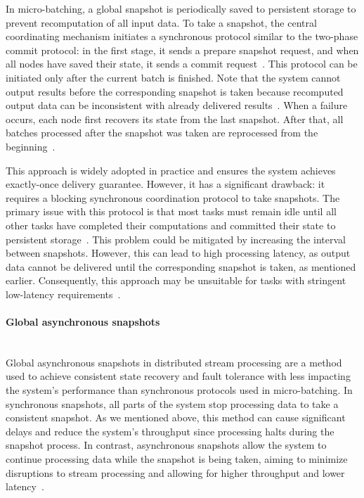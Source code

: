 In micro-batching, a global snapshot is periodically saved to persistent storage to prevent recomputation of all input data. To take a snapshot, the central coordinating mechanism initiates a synchronous protocol similar to the two-phase commit protocol: in the first stage, it sends a prepare snapshot request, and when all nodes have saved their state, it sends a commit request~\cite{carbone2018scalable}. This protocol can be initiated only after the current batch is finished. Note that the system cannot output results before the corresponding snapshot is taken because recomputed output data can be inconsistent with already delivered results~\cite{carbone2018scalable, thepaper}. When a failure occurs, each node first recovers its state from the last snapshot. After that, all batches processed after the snapshot was taken are reprocessed from the beginning~\cite{Zaharia:2012:DSE:2342763.2342773}.

This approach is widely adopted in practice and ensures the system achieves exactly-once delivery guarantee. However, it has a significant drawback: it requires a blocking synchronous coordination protocol to take snapshots. The primary issue with this protocol is that most tasks must remain idle until all other tasks have completed their computations and committed their state to persistent storage~\cite{carbone2018scalable, thepaper}. This problem could be mitigated by increasing the interval between snapshots. However, this can lead to high processing latency, as output data cannot be delivered until the corresponding snapshot is taken, as mentioned earlier. Consequently, this approach may be unsuitable for tasks with stringent low-latency requirements~\cite{carbone2018scalable}.

\paragraph{Global asynchronous snapshots} \mbox{} \\

Global asynchronous snapshots in distributed stream processing are a method used to achieve consistent state recovery and fault tolerance with less impacting the system's performance than synchronous protocols used in micro-batching. In synchronous snapshots, all parts of the system stop processing data to take a consistent snapshot. As we mentioned above, this method can cause significant delays and reduce the system's throughput since processing halts during the snapshot process. In contrast, asynchronous snapshots allow the system to continue processing data while the snapshot is being taken, aiming to minimize disruptions to stream processing and allowing for higher throughput and lower latency~\cite{2015arXiv150608603C, Carbone:2017:SMA:3137765.3137777}.

